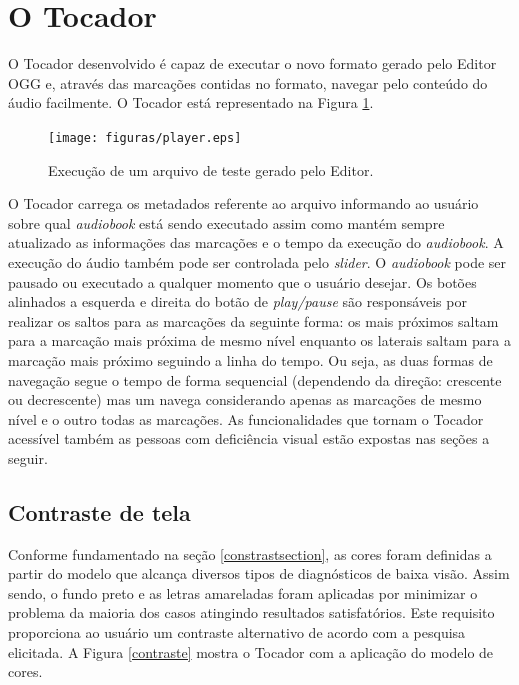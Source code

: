 
\section{O Tocador}

O Tocador desenvolvido é capaz de executar o novo formato gerado pelo Editor OGG e, através das marcações contidas no formato, navegar pelo conteúdo do áudio facilmente. O Tocador está representado na Figura \ref{player}.

 \begin{figure}[ht]
	\centering
		\texttt{[image: figuras/player.eps]}
	\caption{Execução de um arquivo de teste gerado pelo Editor.}
	\label{player}
\end{figure}

O Tocador carrega os metadados referente ao arquivo informando ao usuário sobre qual \textit{audiobook} está sendo executado assim como mantém sempre atualizado as informações das marcações e o tempo da execução do \textit{audiobook}. A execução do áudio também pode ser controlada pelo \textit{slider}. O \textit{audiobook} pode ser pausado ou executado a qualquer momento que o usuário desejar. Os botões alinhados a esquerda e direita do botão de \textit{play/pause} são responsáveis por realizar os saltos para as marcações da seguinte forma: os mais próximos saltam para a marcação mais próxima de mesmo nível enquanto os laterais saltam para a marcação mais próximo seguindo a linha do tempo. Ou seja, as duas formas de navegação segue o tempo de forma sequencial (dependendo da direção: crescente ou decrescente) mas um navega considerando apenas as marcações de mesmo nível e o outro todas as marcações. As funcionalidades que tornam o Tocador acessível também as pessoas com deficiência visual estão expostas nas seções a seguir.

\subsection{Contraste de tela}\label{ttscontraste}

Conforme fundamentado na seção \ref{constrastsection}, as cores foram definidas a partir do modelo que alcança diversos tipos de diagnósticos de baixa visão. Assim sendo, o fundo preto e as letras amareladas foram aplicadas por minimizar o problema da maioria dos casos atingindo resultados satisfatórios. Este requisito proporciona ao usuário um contraste alternativo de acordo com a pesquisa elicitada. A Figura \ref{contraste} mostra o Tocador com a aplicação do modelo de cores.

